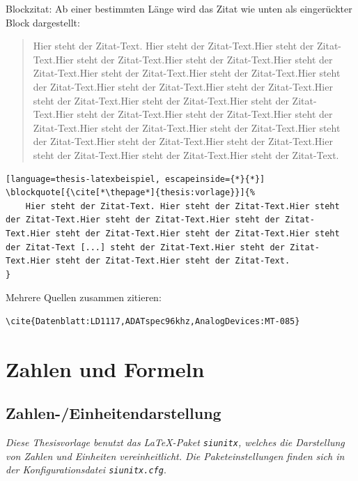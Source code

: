 			\noindent
			Blockzitat: Ab einer bestimmten Länge wird das Zitat wie unten als eingerückter Block dargestellt:%
%			
			\begin{vorlagenbeispiel}
				\blockquote[{\cite[\thepage]{thesis:vorlage}}]{%
					Hier steht der Zitat-Text. Hier steht der Zitat-Text.Hier steht der Zitat-Text.Hier steht der Zitat-Text.Hier steht der Zitat-Text.Hier steht der Zitat-Text.Hier steht der Zitat-Text.Hier steht der Zitat-Text.Hier steht der Zitat-Text.Hier steht der Zitat-Text.Hier steht der Zitat-Text.Hier steht der Zitat-Text.Hier steht der Zitat-Text.Hier steht der Zitat-Text.Hier steht der Zitat-Text.Hier steht der Zitat-Text.Hier steht der Zitat-Text.Hier steht der Zitat-Text.Hier steht der Zitat-Text.Hier steht der Zitat-Text.Hier steht der Zitat-Text.Hier steht der Zitat-Text.Hier steht der Zitat-Text.Hier steht der Zitat-Text.Hier steht der Zitat-Text.
				}
			\end{vorlagenbeispiel}
			\begin{lstlisting}[language=thesis-latexbeispiel, escapeinside={*}{*}]
\blockquote[{\cite[*\thepage*]{thesis:vorlage}}]{%
	Hier steht der Zitat-Text. Hier steht der Zitat-Text.Hier steht der Zitat-Text.Hier steht der Zitat-Text.Hier steht der Zitat-Text.Hier steht der Zitat-Text.Hier steht der Zitat-Text.Hier steht der Zitat-Text [...] steht der Zitat-Text.Hier steht der Zitat-Text.Hier steht der Zitat-Text.Hier steht der Zitat-Text.
}
			\end{lstlisting}
			
			Mehrere Quellen zusammen zitieren:
			\cite{Datenblatt:LD1117,ADATspec96khz,AnalogDevices:MT-085}
			
			\begin{lstlisting}[language=thesis-latexbeispiel]
\cite{Datenblatt:LD1117,ADATspec96khz,AnalogDevices:MT-085}
			\end{lstlisting}
						
		
	\section{Zahlen und Formeln}
		\subsection{Zahlen-/Einheitendarstellung}
			\emph{Diese Thesisvorlage benutzt das \LaTeX-Paket \lstinline|siunitx|, welches die Darstellung von Zahlen und Einheiten vereinheitlicht. Die Paketeinstellungen finden sich in der Konfigurationsdatei \lstinline|siunitx.cfg|}.
			
